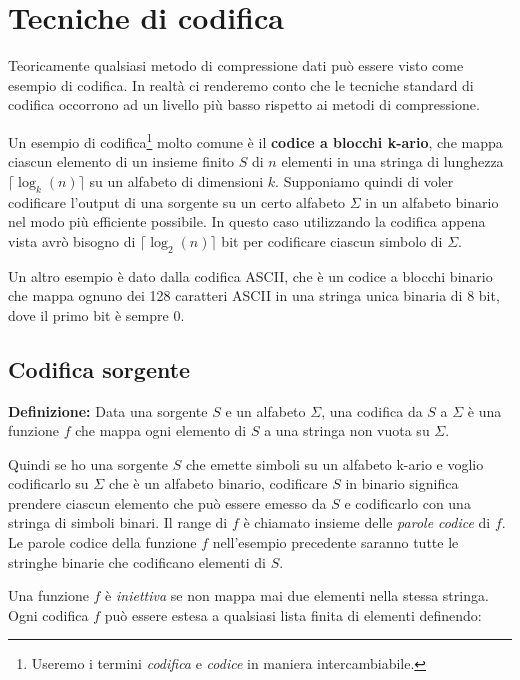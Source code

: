\chapter{Tecniche di codifica}
Teoricamente qualsiasi metodo di compressione dati può essere visto come esempio di codifica. In realtà ci renderemo conto che le tecniche standard di codifica occorrono ad un livello più basso rispetto ai metodi di compressione. 

Un esempio di codifica\footnote{Useremo i termini \textit{codifica} e \textit{codice} in maniera intercambiabile.} molto comune è il \textbf{codice a blocchi k-ario}, che mappa ciascun elemento di un insieme finito \(S\) di \(n\) elementi in una stringa di lunghezza \(\lceil \log_k (n) \rceil\) su un alfabeto di dimensioni \(k\). Supponiamo quindi di voler codificare l'output di una sorgente su un certo alfabeto \(\Sigma\) in un alfabeto binario nel modo più efficiente possibile. In questo caso utilizzando la codifica appena vista avrò bisogno di  \(\lceil \log_2 (n) \rceil\) bit per codificare ciascun simbolo di \(\Sigma\). 

Un altro esempio è dato dalla codifica ASCII, che è un codice a blocchi binario che mappa ognuno dei 128 caratteri ASCII in una stringa unica binaria di 8 bit, dove il primo bit è sempre 0.

\vspace{5mm}

\section{Codifica sorgente}

\textbf{Definizione:} Data una sorgente \(S\) e un alfabeto \(\Sigma\), una codifica da \(S\) a  \(\Sigma\) è una funzione \(f\) che mappa ogni elemento di \(S\) a una stringa non vuota su \(\Sigma\). 

\vspace{5mm}

Quindi se ho una sorgente \(S\) che emette simboli su un alfabeto k-ario e voglio codificarlo su \(\Sigma\) che è un alfabeto binario, codificare \(S\) in binario significa prendere ciascun elemento che può essere emesso da \(S\) e codificarlo con una stringa di simboli binari. Il range di \(f\) è chiamato insieme delle \textit{parole codice} di \(f\). Le parole codice della funzione \(f\) nell'esempio precedente saranno tutte le stringhe binarie che codificano elementi di \(S\).

Una funzione \(f\) è \textit{iniettiva} se non mappa mai due elementi nella stessa stringa. Ogni codifica \(f\) può essere estesa a qualsiasi lista finita di elementi definendo:

